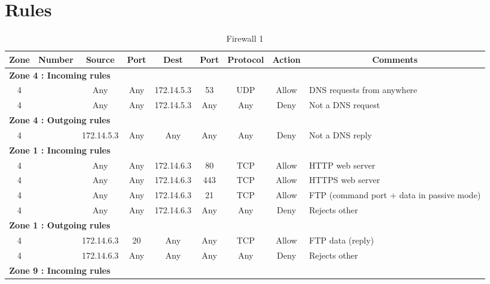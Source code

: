 \documentclass[a4paper,titlepage]{article}
\begin{document}
\section{Rules}
\label{sec:Rules}


\begin{table}[h]
	\center
	\begin{tabular}{c|c|cc|cc|ccl}
		Zone & Number & Source & Port & Dest & Port & Protocol & Action & \multicolumn{1}{c}{Comments}\\

		\hline
		\multicolumn{9}{l}{\textbf{Zone 4 : Incoming rules}}\\
		4 &  & Any & Any & 172.14.5.3 & 53 & UDP & Allow & DNS requests from anywhere\\
		4 &  & Any & Any & 172.14.5.3 & Any & Any & Deny & Not a DNS request\\

		\hline
		\multicolumn{9}{l}{\textbf{Zone 4 : Outgoing rules}}\\
		4 &  & 172.14.5.3 & Any & Any & Any & Any & Deny & Not a DNS reply\\

		\hline
		\multicolumn{9}{l}{\textbf{Zone 1 : Incoming rules}}\\
		4 &  & Any & Any & 172.14.6.3 & 80 & TCP & Allow & HTTP web server\\
		4 &  & Any & Any & 172.14.6.3 & 443 & TCP & Allow & HTTPS web server\\
		4 &  & Any & Any & 172.14.6.3 & 21 & TCP & Allow & FTP (command port + data in passive mode)\\
		4 &  & Any & Any & 172.14.6.3 & Any & Any & Deny & Rejects other\\

		\hline
		\multicolumn{9}{l}{\textbf{Zone 1 : Outgoing rules}}\\
		4 & & 172.14.6.3 & 20 & Any & Any & TCP & Allow & FTP data (reply)\\
		4 & & 172.14.6.3 & Any & Any & Any & Any & Deny & Rejects other\\

		\hline
		\multicolumn{9}{l}{\textbf{Zone 9 : Incoming rules}}\\
	\end{tabular}
	\caption{Firewall 1}
\end{table}

\end{document}
